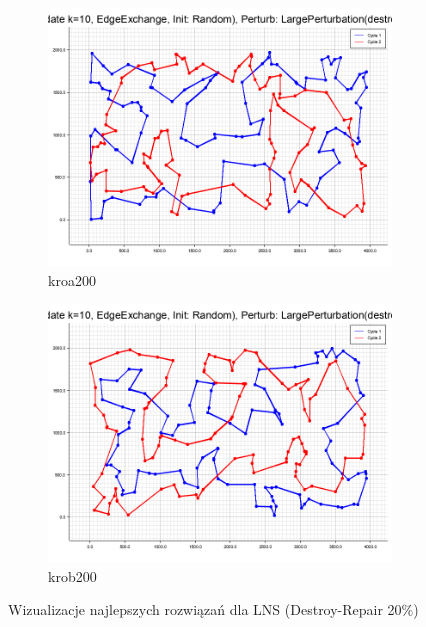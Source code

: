 \documentclass[12pt,a4paper]{article}
\begin{document}
\begin{figure}[H]
\begin{adjustwidth}{-1cm}{-1cm}
    \centering
    \begin{subfigure}[b]{0.5\textwidth}
        \centering
        \includegraphics[width=\textwidth]{figures/kroa200_LNS_Base_Local_Search_Candidate_k_10_EdgeExchange_Init_Random__Perturb_LargePerturbation_destroy_0_20__LS_on_Initial_.png}
        \caption{kroa200}
    \end{subfigure}%
    \hfill
    \begin{subfigure}[b]{0.5\textwidth}
        \centering
        \includegraphics[width=\textwidth]{figures/krob200_LNS_Base_Local_Search_Candidate_k_10_EdgeExchange_Init_Random__Perturb_LargePerturbation_destroy_0_20__LS_on_Initial_.png}
        \caption{krob200}
    \end{subfigure}
    \caption{Wizualizacje najlepszych rozwiązań dla LNS (Destroy-Repair 20\%)}
    \label{fig:lns}
\end{adjustwidth}
\end{figure}
\end{document}
